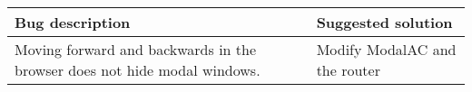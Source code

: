 \begin{tabular}{|p{5.5cm} | p{5.5cm}|}
	\hline
	\textbf{Bug description} & \textbf{Suggested solution} \\ \hline
	Moving forward and backwards in the browser does not hide modal windows. & Modify ModalAC and the router \\ \hline
\end{tabular}
